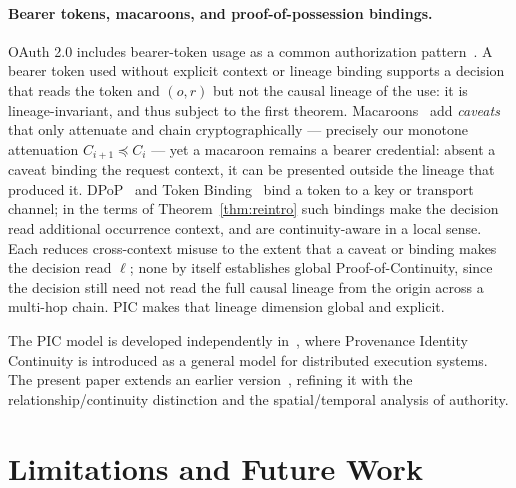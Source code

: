 \documentclass[11pt]{article}
\begin{document}
\paragraph{Bearer tokens, macaroons, and proof-of-possession bindings.}
OAuth 2.0 includes bearer-token usage as a common authorization
pattern~\cite{hardt2012oauth,jones2012bearer}. A bearer token used without
explicit context or lineage binding supports a decision that reads the token and
$(o,r)$ but not the causal lineage of the use: it is lineage-invariant, and thus
subject to the first theorem. Macaroons~\cite{birgisson2014macaroons} add
\emph{caveats} that only attenuate and chain cryptographically --- precisely our
monotone attenuation $C_{i+1}\preceq C_i$ --- yet a macaroon remains a bearer
credential: absent a caveat binding the request context, it can be presented
outside the lineage that produced it. DPoP~\cite{fett2023dpop} and Token
Binding~\cite{popov2018token} bind a token to a key or transport channel; in the
terms of Theorem~\ref{thm:reintro} such bindings make the decision read
additional occurrence context, and are continuity-aware in a local sense. Each
reduces cross-context misuse to the extent that a caveat or binding makes the
decision read $\ell$; none by itself establishes global Proof-of-Continuity, since
the decision still need not read the full causal lineage from the origin across a
multi-hop chain. PIC makes that lineage dimension global and explicit.

The PIC model is developed independently in~\cite{gallo2025pic}, where Provenance
Identity Continuity is introduced as a general model for distributed execution
systems. The present paper extends an earlier version~\cite{gallo2025apm},
refining it with the relationship/continuity distinction and the spatial/temporal
analysis of authority.

\section{Limitations and Future Work}
\end{document}
